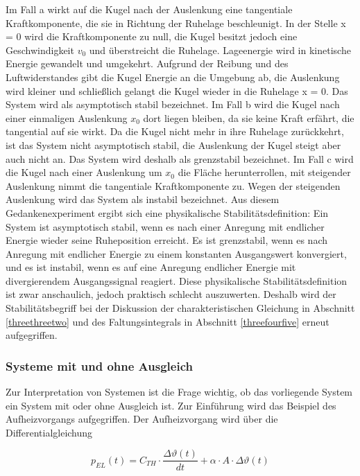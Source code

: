 \noindent Im Fall a wirkt auf die Kugel nach der Auslenkung eine tangentiale Kraftkomponente, die sie in Richtung der Ruhelage beschleunigt. In der Stelle x = 0 wird die Kraftkomponente zu null, die Kugel besitzt jedoch eine Geschwindigkeit $v_{0}$  und überstreicht die Ruhelage. Lageenergie wird in kinetische
Energie gewandelt und umgekehrt. Aufgrund der Reibung und des Luftwiderstandes gibt die Kugel Energie an die Umgebung ab, die Auslenkung wird kleiner und schließlich gelangt die Kugel wieder
in die Ruhelage x = 0. Das System wird als asymptotisch stabil bezeichnet. Im Fall b wird die Kugel nach einer einmaligen Auslenkung $x_{0}$ dort liegen bleiben, da sie keine Kraft erfährt, die tangential auf sie wirkt. Da die Kugel nicht mehr in ihre Ruhelage zurückkehrt, ist das System nicht asymptotisch stabil, die Auslenkung der Kugel steigt aber auch nicht an. Das System wird deshalb als grenzstabil bezeichnet. Im Fall c wird die Kugel nach einer Auslenkung um $x_{0}$ die Fläche herunterrollen, mit steigender Auslenkung nimmt die tangentiale Kraftkomponente zu. Wegen der steigenden Auslenkung wird das System als instabil bezeichnet.\newline
Aus diesem Gedankenexperiment ergibt sich eine physikalische Stabilitätsdefinition: Ein System ist asymptotisch stabil, wenn es nach einer Anregung mit endlicher Energie wieder seine Ruheposition erreicht. Es ist grenzstabil, wenn es nach Anregung mit endlicher Energie zu einem konstanten Ausgangswert konvergiert, und es ist instabil, wenn es auf eine Anregung endlicher Energie mit divergierendem Ausgangssignal reagiert.\newline
Diese physikalische Stabilitätsdefinition ist zwar anschaulich, jedoch praktisch schlecht auszuwerten. Deshalb wird der Stabilitätsbegriff bei der Diskussion der charakteristischen Gleichung in Abschnitt \ref{threethreetwo} und des Faltungsintegrals in Abschnitt \ref{threefourfive} erneut aufgegriffen.

\subsubsection{Systeme mit und ohne Ausgleich}

\noindent Zur Interpretation von Systemen ist die Frage wichtig, ob das vorliegende System ein System mit oder ohne Ausgleich ist. Zur Einführung wird das Beispiel des Aufheizvorgangs aufgegriffen. Der Aufheizvorgang wird über die Differentialgleichung

\begin{equation}\label{eq:threefiftyfour}
p_{EL}(t) = C_{TH}\cdot \frac{\Delta\vartheta(t)}{dt}+ \alpha\cdot A \cdot \Delta\vartheta(t)
\end{equation}

